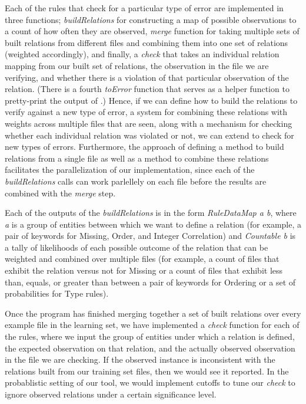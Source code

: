Each of the rules that check for a particular type of error are implemented in three functions;
   \textit{buildRelations} for constructing a map of possible observations to a count of how often they are observed, 
   \textit{merge} function for taking multiple sets of built relations from different files and combining them into one set of relations (weighted accordingly), 
   and finally, a \textit{check} that takes an individual relation mapping from our built set of relations, the observation in the file we are verifying, and whether there is a violation of that particular observation of the relation. 
(There is a fourth \textit{toError} function that serves as a helper function to pretty-print the output of \app.) 
Hence, if we can define how to build the relations to verify against a new type of error, a system for combining these relations with weights across multiple files that are seen, along with a mechanism for checking whether each individual relation was violated or not, we can extend \app to check for new types of errors. Furthermore, the approach of defining a method to build relations from a single file as well as a method to combine these relations facilitates the parallelization of our implementation, since each of the \textit{buildRelations} calls can work parlellely on each file before the results are combined with the \textit{merge} step.

Each of the outputs of the \textit{buildRelations} is in the form \textit{RuleDataMap a b}, where \textit{a} is a group of entities between which we want to define a relation (for example, a pair of keywords for Missing, Order, and Integer Correlation) and \textit{Countable b} is a tally of likelihoods of each possible outcome of the relation that can be weighted and combined over multiple files (for example, a count of files that exhibit the relation versus not for Missing or a count of files that exhibit less than, equals, or greater than between a pair of keywords for Ordering or a set of probabilities for Type rules).

Once the program has finished merging together a set of built relations over every example file in the learning set, we have implemented a \textit{check} function for each of the rules, where we input the group of entities under which a relation is defined, the expected observation on that relation, and the actually observed observation in the file we are checking. If the observed instance is inconsistent with the relations built from our training set files, then we would see it reported. In the probablistic setting of our tool, we would implement cutoffs to tune our \textit{check} to ignore observed relations under a certain significance level.

